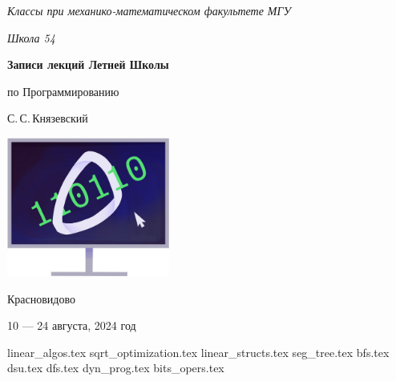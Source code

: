 \documentclass[a5paper, 10pt, twoside]{article}
\begin{document}
\begin{titlepage}
    \centering
    \vspace*{\fill}
    
    {\sl\large Классы при механико-математическом факультете МГУ} \medskip

    {\sl\large Школа 54}

    \vspace*{4cm}

    \begin{spacing}{1}
        \LARGE\bfseries Записи лекций Летней Школы\par по Программированию
    \end{spacing}
    \smallskip
    
    {\Large С.\,С.\,Князевский}
    \vspace{.6cm}
    
    \includegraphics[width=0.4\textwidth]{img/logo.jpg}

    \vspace*{4cm}

    {\large Красновидово}\medskip
    
    {\large 10 --- 24 августа, 2024 год}
    \vspace*{\fill}
\end{titlepage}

\tableofcontents
\newpage

{linear_algos.tex}
{sqrt_optimization.tex}
{linear_structs.tex}
{seg_tree.tex}
{bfs.tex}
{dsu.tex}
{dfs.tex}
{dyn_prog.tex}
{bits_opers.tex}
\end{document}

